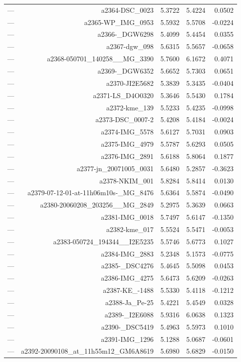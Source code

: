 \begin{table}[htbp]
\begin{tabular}{lrrrr}
— & a2364-DSC_0023 & 5.3722 & 5.4224 & 0.0502 \\
— & a2365-WP_IMG_0953 & 5.5932 & 5.5708 & -0.0224 \\
— & a2366-_DGW6298 & 5.4099 & 5.4454 & 0.0355 \\
— & a2367-dgw_098 & 5.6315 & 5.5657 & -0.0658 \\
— & a2368-050701_140258__MG_3390 & 5.7600 & 6.1672 & 0.4071 \\
— & a2369-_DGW6352 & 5.6652 & 5.7303 & 0.0651 \\
— & a2370-JI2E5682 & 5.3839 & 5.3435 & -0.0404 \\
— & a2371-LS_D4O0320 & 5.3646 & 5.5430 & 0.1784 \\
— & a2372-kme_139 & 5.5233 & 5.4235 & -0.0998 \\
— & a2373-DSC_0007-2 & 5.4208 & 5.4184 & -0.0024 \\
— & a2374-IMG_5578 & 5.6127 & 5.7031 & 0.0903 \\
— & a2375-IMG_4979 & 5.5787 & 5.6293 & 0.0505 \\
— & a2376-IMG_2891 & 5.6188 & 5.8064 & 0.1877 \\
— & a2377-jn_20071005_0031 & 5.6480 & 5.2857 & -0.3623 \\
— & a2378-NKIM_001 & 5.8284 & 5.8414 & 0.0130 \\
— & a2379-07-12-01-at-11h06m10s-_MG_8476 & 5.6364 & 5.5874 & -0.0490 \\
— & a2380-20060208_203256__MG_2849 & 5.2975 & 5.3639 & 0.0663 \\
— & a2381-IMG_0018 & 5.7497 & 5.6147 & -0.1350 \\
— & a2382-kme_017 & 5.5524 & 5.5471 & -0.0053 \\
— & a2383-050724_194344__I2E5235 & 5.5746 & 5.6773 & 0.1027 \\
— & a2384-IMG_2883 & 5.2348 & 5.1573 & -0.0775 \\
— & a2385-_DSC4276 & 5.4645 & 5.5098 & 0.0453 \\
— & a2386-IMG_4275 & 5.6473 & 5.6209 & -0.0263 \\
— & a2387-KE_-1488 & 5.5330 & 5.4118 & -0.1212 \\
— & a2388-Ja_Pe-25 & 5.4221 & 5.4549 & 0.0328 \\
— & a2389-_I2E6088 & 5.9316 & 6.0638 & 0.1323 \\
— & a2390-_DSC5419 & 5.4963 & 5.5973 & 0.1010 \\
— & a2391-IMG_1296 & 5.1288 & 5.0687 & -0.0601 \\
— & a2392-20090108_at_11h55m12_GM6A8619 & 5.6980 & 5.6829 & -0.0150 \\

\end{tabular}
\end{table}

